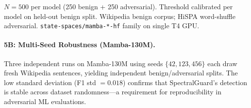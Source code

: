 \documentclass[10pt,twocolumn]{article}
\begin{document}
\begin{table}[t]
\centering
\caption{SpectralGuard: Detection Across Model Scales (Experiment 5A)}
\label{tab:scaling}
\small
{}
\vspace{2pt}
\begin{minipage}{\columnwidth}
{\footnotesize $N{=}500$ per model (250 benign + 250 adversarial).
Threshold calibrated per model on held-out benign split.
Wikipedia benign corpus; HiSPA word-shuffle adversarial.
\texttt{state-spaces/mamba-*-hf} family on single T4 GPU.}
\end{minipage}
\end{table}

\paragraph{5B: Multi-Seed Robustness (Mamba-130M).}
Three independent runs on Mamba-130M using seeds $\{42, 123, 456\}$ each draw
fresh Wikipedia sentences, yielding independent benign/adversarial splits. The low standard deviation (F1 std $= 0.018$) confirms that SpectralGuard's detection is stable across dataset randomness---a requirement
for reproducibility in adversarial ML evaluations.

\begin{table}[ht]
\centering
\caption{Multi-Seed Robustness on Mamba-130M.}
\end{table}
\end{document}
